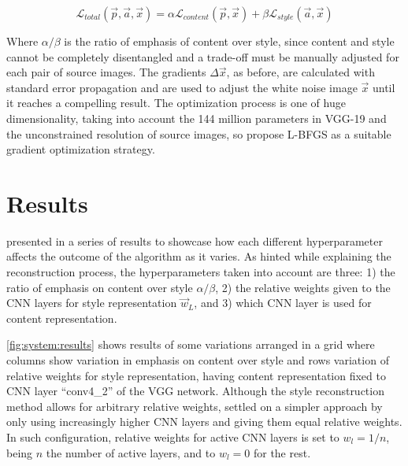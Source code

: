 \begin{equation}
  \mathcal{L}_{total}(\vec{p}, \vec{a}, \vec{x}) =
    \alpha \mathcal{L}_{content}(\vec{p}, \vec{x}) +
    \beta \mathcal{L}_{style}(\vec{a}, \vec{x})
\end{equation}

Where $\alpha/\beta$ is the ratio of emphasis of content over style, since content and style cannot be completely disentangled and a trade-off must be manually adjusted for each pair of source images.
The gradients $\Delta \vec{x}$, as before, are calculated with standard error propagation and are used to adjust the white noise image $\vec{x}$ until it reaches a compelling result.
The optimization process is one of huge dimensionality, taking into account the 144 million parameters in VGG-19 \cite{Simonyan2014} and the unconstrained resolution of source images, so \citeauthor{Gatys2015A} propose L-BFGS \cite{Zhu1994} as a suitable gradient optimization strategy.



\section{Results}
\label{sec:system:results}

\citeauthor{Gatys2015B} presented in \cite{Gatys2015B} a series of results to showcase how each different hyperparameter affects the outcome of the algorithm as it varies.
As hinted while explaining the reconstruction process, the hyperparameters taken into account are three: 1) the ratio of emphasis on content over style $\alpha / \beta$, 2) the relative weights given to the CNN layers for style representation $\vec{w}_L$, and 3) which CNN layer is used for content representation.

\autoref{fig:system:results} shows results of some variations arranged in a grid where columns show variation in emphasis on content over style and rows variation of relative weights for style representation, having content representation fixed to CNN layer ``conv4\_2'' of the VGG network.
Although the style reconstruction method allows for arbitrary relative weights, \citeauthor{Gatys2015B} settled on a simpler approach by only using increasingly higher CNN layers and giving them equal relative weights.
In such configuration, relative weights for active CNN layers is set to $w_l = 1/n$, being $n$ the number of active layers, and to $w_l = 0$ for the rest.

